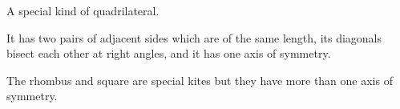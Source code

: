 A special kind of quadrilateral.  

\par
It has two pairs of adjacent sides which are of the same length, its diagonals 
bisect each other at right angles, and it has one axis of symmetry.

\par
The rhombus and square are special kites but they have more than one axis of symmetry.   
